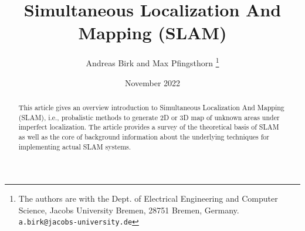 \documentclass{article}
\title{Simultaneous Localization And Mapping (SLAM)}
\author{Andreas Birk and Max Pfingsthorn
\thanks{The authors are with the Dept. of Electrical Engineering and Computer Science, Jacobs University Bremen, 28751
Bremen, Germany. {\tt\small
a.birk@jacobs-university.de}}}
\date{November 2022}
\begin{document}
\begin{abstract}
    This article gives an overview introduction to Simultaneous Localization And Mapping (SLAM), i.e., probalistic methods to generate 2D or 3D map of unknown areas under imperfect localization. The article provides a survey of the theoretical basis of SLAM as well as the core of background information about the underlying techniques for implementing actual SLAM systems.
\end{abstract}
\maketitle
{\small


}
\end{document}
